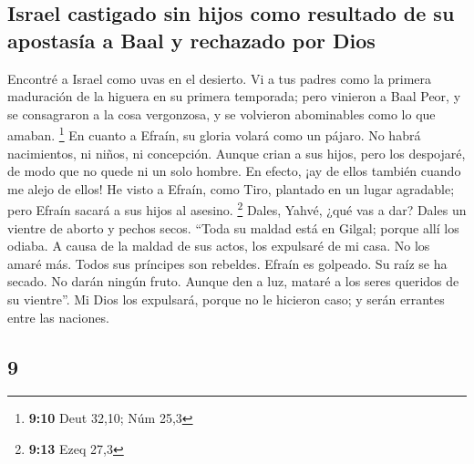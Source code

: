 \begin{paracol}{2}
\hypertarget{israel-castigado-sin-hijos-como-resultado-de-su-apostasuxeda-a-baal-y-rechazado-por-dios}{%
\subsection{Israel castigado sin hijos como resultado de su apostasía a
Baal y rechazado por
Dios}\label{israel-castigado-sin-hijos-como-resultado-de-su-apostasuxeda-a-baal-y-rechazado-por-dios}}

 Encontré a Israel como uvas en el desierto. Vi a tus
padres como la primera maduración de la higuera en su primera temporada;
pero vinieron a Baal Peor, y se consagraron a la cosa vergonzosa, y se
volvieron abominables como lo que amaban. \footnote{\textbf{9:10} Deut
  32,10; Núm 25,3}  En cuanto a Efraín, su gloria volará
como un pájaro. No habrá nacimientos, ni niños, ni concepción.
 Aunque crian a sus hijos, pero los despojaré, de modo
que no quede ni un solo hombre. En efecto, ¡ay de ellos también cuando
me alejo de ellos!  He visto a Efraín, como Tiro,
plantado en un lugar agradable; pero Efraín sacará a sus hijos al
asesino. \footnote{\textbf{9:13} Ezeq 27,3}  Dales,
Yahvé, ¿qué vas a dar? Dales un vientre de aborto y pechos secos.
 ``Toda su maldad está en Gilgal; porque allí los odiaba.
A causa de la maldad de sus actos, los expulsaré de mi casa. No los
amaré más. Todos sus príncipes son rebeldes.  Efraín es
golpeado. Su raíz se ha secado. No darán ningún fruto. Aunque den a luz,
mataré a los seres queridos de su vientre''.  Mi Dios los
expulsará, porque no le hicieron caso; y serán errantes entre las
naciones.

\switchcolumn
\begin{otherlanguage}{english}

\hypertarget{section-17}{%
\section{9}\label{section-17}}


\end{otherlanguage}
\end{paracol}
